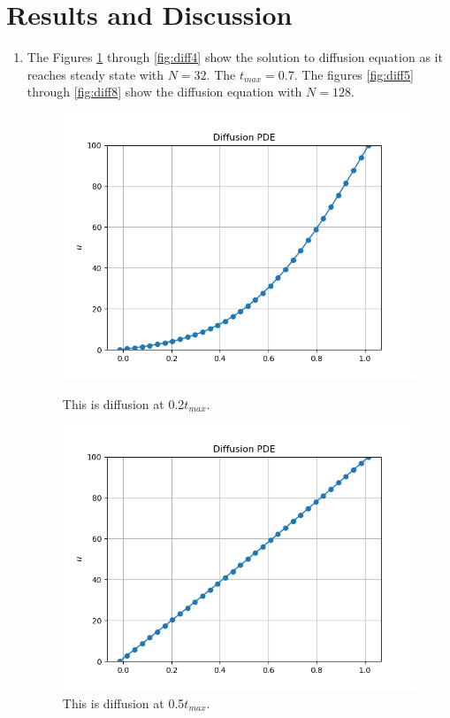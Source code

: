 \documentclass[12pt]{article}
\begin{document}
\section{Results and Discussion}
	\begin{enumerate}[label=(\alph*)]
		\item The Figures \ref{fig:diff1} through \ref{fig:diff4} show the solution to diffusion equation as it reaches steady state with $N = 32$. The $t_{max} = 0.7$. The figures \ref{fig:diff5} through \ref{fig:diff8} show the diffusion equation with $N=128$.
		\begin{figure}[htb]
		\centering
		\begin{minipage}[c]{0.48\textwidth}
			\centering
			\includegraphics[width=0.7\linewidth]{./PDE/figures/diffusion_32_upwind/result_diffusion_32_upwind_1.png}
			\caption{This is diffusion at 0.2$t_{max}$.}
			\label{fig:diff1}
		\end{minipage}
		\hspace{0.1in}
		\begin{minipage}[c]{0.48\textwidth}
			\centering
			\includegraphics[width=0.7\linewidth]{./PDE/figures/diffusion_32_upwind/result_diffusion_32_upwind_5.png}
			\caption{This is diffusion at 0.5$t_{max}$.}

\end{minipage}
\end{figure}
\end{enumerate}
\end{document}
